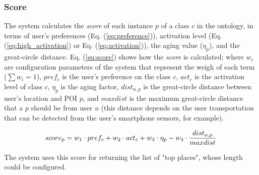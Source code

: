 \subsubsection{\bf Score} \label{section:score}
The system calculates the \textit{score} of each instance $p$ of a class $c$ in  the ontology, in terms of user's preferences (Eq. (\ref{eq:preference})), activation level (Eq. (\ref{eq:high_activation}) or Eq. (\ref{eq:activation})), the aging value ($\eta_p$), and the great-circle distance. Eq. (\ref{eq:score}) shows how the \textit{score} is calculated; where $w_i$ are configuration parameters of the system that represent the weigh of each term ($\sum w_i =1$), $pref_c$ is the user's preference on the class $c$, $act_c$ is the activation level of class $c$, $\eta_p$ is the aging factor, $dist_{u,p}$ is the great-circle distance between user's location and POI $p$, and $maxdist$ is the maximum great-circle distance that a $p$ should be from user $u$  (this distance depends on the user transportation that can be detected  from the user's smartphone sensors, for example).


\vspace{-0.3cm}
\begin{equation} \label{eq:score}
\footnotesize{ score_p =   w_1 \cdot pref_c + w_2 \cdot act_c 
                                        + w_3 \cdot \eta_p - w_4 \cdot \frac{dist_{u,p}}{maxdist}
 }
\end{equation}

The system uses this score for returning the list of "top places", whose length could be configured.





